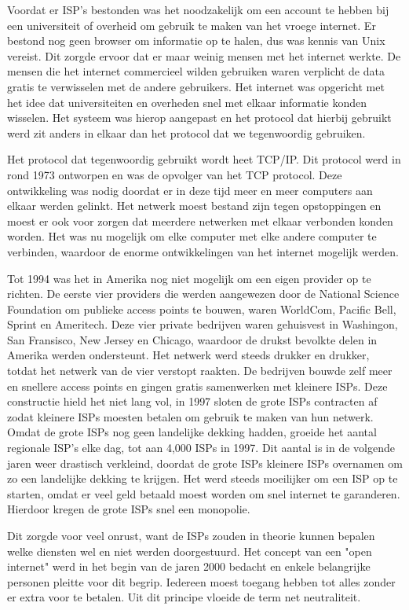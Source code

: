 Voordat er ISP's bestonden was het noodzakelijk om een account te hebben bij een universiteit of overheid om gebruik te maken van het vroege internet. Er bestond nog geen browser om informatie op te halen, dus was kennis van Unix vereist. Dit zorgde ervoor dat er maar weinig mensen met het internet werkte. De mensen die het internet commercieel wilden gebruiken waren verplicht de data gratis te verwisselen met de andere gebruikers. Het internet was opgericht met het idee dat universiteiten en overheden snel met elkaar informatie konden wisselen. Het systeem was hierop aangepast en het protocol dat hierbij gebruikt werd zit anders in elkaar dan het protocol dat we tegenwoordig gebruiken.

Het protocol dat tegenwoordig gebruikt wordt heet TCP/IP. Dit protocol werd in rond 1973 ontworpen en was de opvolger van het TCP protocol. Deze ontwikkeling was nodig doordat er in deze tijd meer en meer computers aan elkaar werden gelinkt. Het netwerk moest bestand zijn tegen opstoppingen en moest er ook voor zorgen dat meerdere netwerken met elkaar verbonden konden worden. Het was nu mogelijk om elke computer met elke andere computer te verbinden, waardoor de enorme ontwikkelingen van het internet mogelijk werden.

Tot 1994 was het in Amerika nog niet mogelijk om een eigen provider op te richten. De eerste vier providers die werden aangewezen door de National Science Foundation om publieke access points te bouwen, waren WorldCom, Pacific Bell, Sprint en Ameritech. Deze vier private bedrijven waren gehuisvest in Washingon, San Fransisco, New Jersey en Chicago, waardoor de drukst bevolkte delen in Amerika werden ondersteunt. Het netwerk werd steeds drukker en drukker, totdat het netwerk van de vier verstopt raakten. De bedrijven bouwde zelf meer en snellere access points en gingen gratis samenwerken met kleinere ISPs. Deze constructie hield het niet lang vol, in 1997 sloten de grote ISPs contracten af zodat kleinere ISPs moesten betalen om gebruik te maken van hun netwerk. Omdat de grote ISPs nog geen landelijke dekking hadden, groeide het aantal regionale ISP's elke dag, tot aan 4,000 ISPs in 1997. Dit aantal is in de volgende jaren weer drastisch verkleind, doordat de grote ISPs kleinere ISPs overnamen om zo een landelijke dekking te krijgen. Het werd steeds moeilijker om een ISP op te starten, omdat er veel geld betaald moest worden om snel internet te garanderen. Hierdoor kregen de grote ISPs snel een monopolie.

Dit zorgde voor veel onrust, want de ISPs zouden in theorie kunnen bepalen welke diensten wel en niet werden doorgestuurd. Het concept van een "open internet" werd in het begin van de jaren 2000 bedacht en enkele belangrijke personen pleitte voor dit begrip. Iedereen moest toegang hebben tot alles zonder er extra voor te betalen. Uit dit principe vloeide de term net neutraliteit.